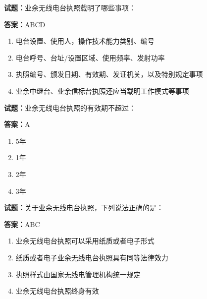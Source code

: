 \documentclass{ctexbook}
\begin{document}
\textbf{试题：}业余无线电台执照载明了哪些事项： 

\textbf{答案：}ABCD 

\begin{enumerate}[leftmargin=3em]
  \item 电台设置、使用人，操作技术能力类别、编号 

  \item 电台呼号、台址/设置区域、使用频率、发射功率 

  \item 执照编号、颁发日期、有效期、发证机关，以及特别规定事项 

  \item 业余中继台、业余信标台执照还应当载明工作模式等事项 

\end{enumerate}





\vspace{1em}

\textbf{试题：}业余无线电台执照的有效期不超过： 

\textbf{答案：}A 

\begin{enumerate}[leftmargin=3em]
  \item 5年 

  \item 1年 

  \item 2年 

  \item 3年 

\end{enumerate}





\vspace{1em}

\textbf{试题：}关于业余无线电台执照，下列说法正确的是： 

\textbf{答案：}ABC 

\begin{enumerate}[leftmargin=3em]
  \item 业余无线电台执照可以采用纸质或者电子形式 


  \item 纸质或者电子业余无线电台执照具有同等法律效力 

  \item 执照样式由国家无线电管理机构统一规定 

  \item 业余无线电台执照终身有效 

\end{enumerate}
\end{document}
